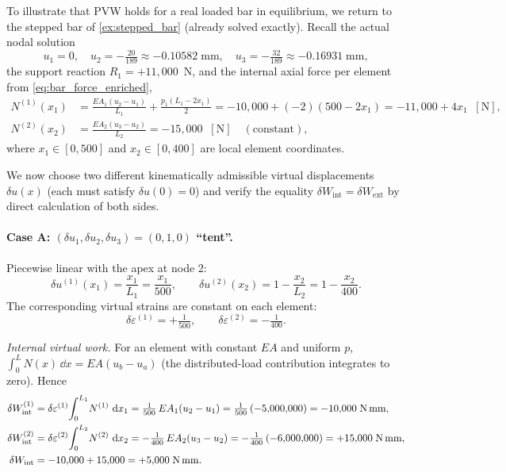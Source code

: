 \begin{example}[Numerical verification of $\delta W_{\mathrm{int}} = \delta W_{\mathrm{ext}}$]
\label{ex:pvw_verification}

To illustrate that PVW holds for a real loaded bar in equilibrium, we
return to the stepped bar of \cref{ex:stepped_bar} (already solved
exactly). Recall the actual nodal solution
\[
   u_1 = 0,\quad
   u_2 = -\tfrac{20}{189} \approx -0.10582 \;\text{mm},\quad
   u_3 = -\tfrac{32}{189} \approx -0.16931 \;\text{mm},
\]
the support reaction $R_1 = +11{,}000$~N, and the internal axial force per
element from \cref{eq:bar_force_enriched},
\begin{align*}
   N^{(1)}(x_1) &= \tfrac{EA_1(u_2-u_1)}{L_1} + \tfrac{p_1(L_1-2x_1)}{2}
                = -10{,}000 + (-2)(500-2x_1)
                = -11{,}000 + 4x_1 \;\;[\text{N}], \\
   N^{(2)}(x_2) &= \tfrac{EA_2(u_3-u_2)}{L_2}
                = -15{,}000 \;\;[\text{N}] \quad (\text{constant}),
\end{align*}
where $x_1 \in [0,500]$ and $x_2 \in [0,400]$ are local element coordinates.

We now choose two different kinematically admissible virtual displacements
$\delta u(x)$ (each must satisfy $\delta u(0)=0$) and verify the equality
$\delta W_{\mathrm{int}} = \delta W_{\mathrm{ext}}$ by direct calculation
of both sides.

\paragraph{Case A: $(\delta u_1,\delta u_2,\delta u_3) = (0,1,0)$ ``tent''.}

Piecewise linear with the apex at node 2:
\[
   \delta u^{(1)}(x_1) = \frac{x_1}{L_1} = \frac{x_1}{500}, \qquad
   \delta u^{(2)}(x_2) = 1 - \frac{x_2}{L_2} = 1 - \frac{x_2}{400} .
\]
The corresponding virtual strains are constant on each element:
\[
   \delta\varepsilon^{(1)} = +\tfrac{1}{500}, \qquad
   \delta\varepsilon^{(2)} = -\tfrac{1}{400} .
\]

\noindent\emph{Internal virtual work.}
For an element with constant $EA$ and uniform $p$, $\int_0^{L} N(x)\,\dd x =
EA(u_b - u_a)$ (the distributed-load contribution integrates to zero). Hence
\begin{align*}
   \delta W_{\mathrm{int}}^{(1)}
   &= \delta\varepsilon^{(1)}\!\int_0^{L_1}\! N^{(1)}\,\,\mathrm{d} x_1
    = \tfrac{1}{500}\,EA_1(u_2-u_1)
    = \tfrac{1}{500}\,(-5{,}000{,}000) = -10{,}000\;\text{N\,mm}, \\
   \delta W_{\mathrm{int}}^{(2)}
   &= \delta\varepsilon^{(2)}\!\int_0^{L_2}\! N^{(2)}\,\,\mathrm{d} x_2
    = -\tfrac{1}{400}\,EA_2(u_3-u_2)
    = -\tfrac{1}{400}\,(-6{,}000{,}000) = +15{,}000\;\text{N\,mm}, \\
   \delta W_{\mathrm{int}}
   &= -10{,}000 + 15{,}000 = +5{,}000 \;\text{N\,mm}.
\end{align*}


\end{example}
